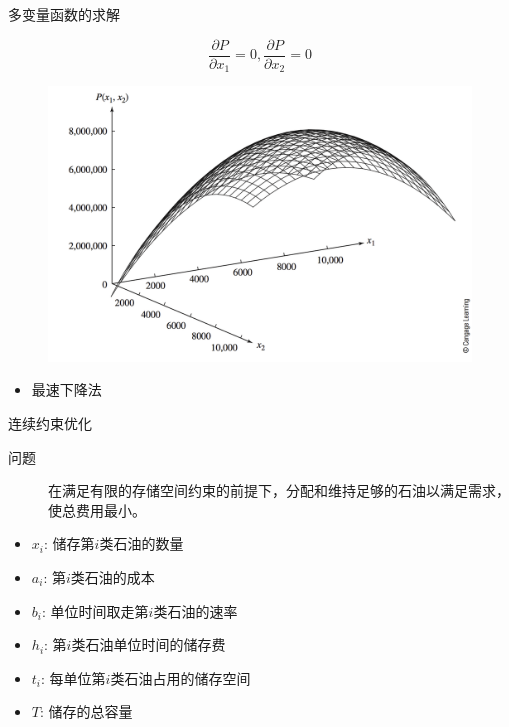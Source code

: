 \documentclass[UTF8]{ctexbeamer}
\begin{document}
\begin{frame}{多变量函数的求解}

  \[
    \frac{\partial P}{\partial x_1} = 0, \frac{\partial P}{\partial x_2} = 0
  \]

  \begin{figure}
    \centering
    \includegraphics[width=.6\textwidth{}]{13_9.png}
  \end{figure}

  \begin{itemize}
  \item 最速下降法
  \end{itemize}
\end{frame}

\begin{frame}{连续约束优化}
  \begin{description}
  \item[问题] 在满足有限的存储空间约束的前提下，分配和维持足够的石油以满足需求，
    使总费用最小。
  \end{description}
  \begin{itemize}
  \item $x_i$: 储存第$i$类石油的数量
  \item $a_i$: 第$i$类石油的成本
  \item $b_i$: 单位时间取走第$i$类石油的速率
  \item $h_i$: 第$i$类石油单位时间的储存费
  \item $t_i$: 每单位第$i$类石油占用的储存空间
  \item $T$: 储存的总容量
  \end{itemize}
  
\end{frame}
\end{document}
